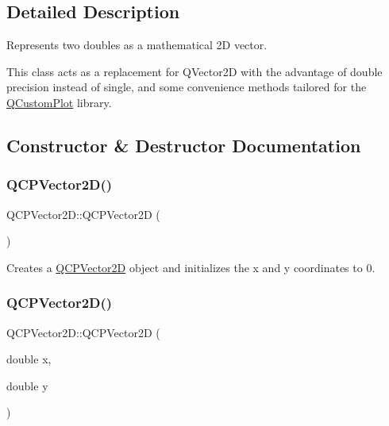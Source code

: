 \subsection{Detailed Description}
Represents two doubles as a mathematical 2D vector. 

This class acts as a replacement for Q\+Vector2D with the advantage of double precision instead of single, and some convenience methods tailored for the \hyperlink{classQCustomPlot}{Q\+Custom\+Plot} library. 

\subsection{Constructor \& Destructor Documentation}
\mbox{\label{classQCPVector2D_a04c90748c3623044c79fa20788ffbcc6}} 
\subsubsection{\texorpdfstring{Q\+C\+P\+Vector2\+D()}{QCPVector2D()}\hspace{0.1cm}{\footnotesize\ttfamily [1/4]}}
{\footnotesize\ttfamily Q\+C\+P\+Vector2\+D\+::\+Q\+C\+P\+Vector2D (\begin{DoxyParamCaption}{ }\end{DoxyParamCaption})}

Creates a \hyperlink{classQCPVector2D}{Q\+C\+P\+Vector2D} object and initializes the x and y coordinates to 0. \mbox{\label{classQCPVector2D_a47bd86cebc5588dad6ec84349d9098d4}} 
\subsubsection{\texorpdfstring{Q\+C\+P\+Vector2\+D()}{QCPVector2D()}\hspace{0.1cm}{\footnotesize\ttfamily [2/4]}}
{\footnotesize\ttfamily Q\+C\+P\+Vector2\+D\+::\+Q\+C\+P\+Vector2D (\begin{DoxyParamCaption}\item[{double}]{x,  }\item[{double}]{y }\end{DoxyParamCaption})}

